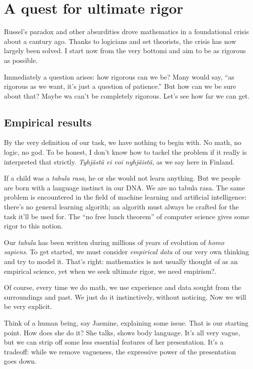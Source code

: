 \documentclass[11pt,oneside,%
]{memoir}
\theoremstyle{definition}
\begin{document}

\chapter{A quest for ultimate rigor}

Russel's paradox and other absurdities drove mathematics in a foundational crisis about a cantury ago. Thanks to logicians and set theorists, the crisis has now largely been solved. I start now from the very bottomi and aim to be as rigorous as possible.

Immediately a question arises: how rigorous can we be? Many would say, ``as rigorous as we want, it's just a question of patience.'' But how can we be sure about that? Maybe wa can't be completely rigorous. Let's see how far we can get.

\section{Empirical results}

By the very definition of our task, we have nothing to begin with. No math, no logic, no god. To be honest, I don't know how to tackel the problem if it really is interpreted that strictly. \emph{Tyhjästä ei voi nyhjäistä}, as we say here in Finland.

If a child was a \emph{tabula rasa}, he or she would not learn anything. But we people are born with a language instinct in our DNA. We are no tabula rasa. The same problem is encountered in the field of machine learning and artificial intelligence: there's no general learning algorith; an algorith must always be crafted for the task it'll be used for. The ``no free lunch theorem'' of computer science gives some rigor to this notion.

Our \emph{tabula} has been written during millions of years of evolution of \emph{homo sapiens}. To get started, we must consider \emph{empirical data} of our very own thinking and try to model it. That's right: mathematics is not usually thought of as an empirical science, yet when we seek ultimate rigor, we need empirism?.

Of course, every time we do math, we use experience and data sought from the surroundings and past. We just do it instinctively, without noticing. Now we will be very explicit.

Think of a human being, say Jasmine, explaining some issue. That is our starting point. How does she do it? She talks, shows body language. It's all very vague, but we can strip off some less essential features of her presentation. It's a tradeoff: while we remove vagueness, the expressive power of the presentation goes down.
\end{document}
